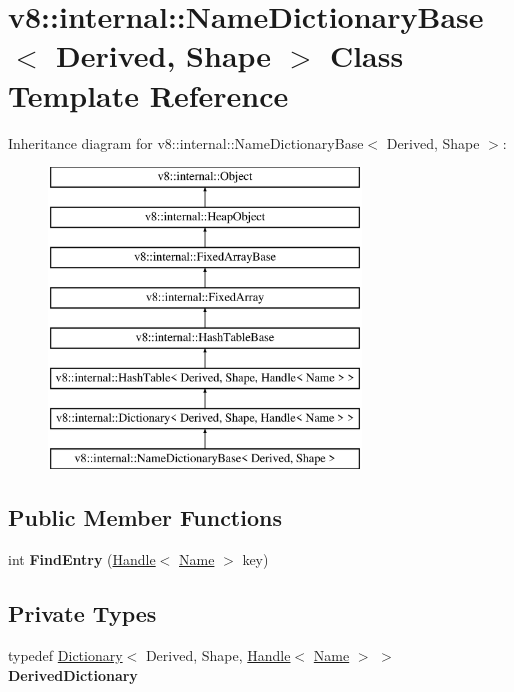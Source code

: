 \hypertarget{classv8_1_1internal_1_1_name_dictionary_base}{}\section{v8\+:\+:internal\+:\+:Name\+Dictionary\+Base$<$ Derived, Shape $>$ Class Template Reference}
\label{classv8_1_1internal_1_1_name_dictionary_base}
Inheritance diagram for v8\+:\+:internal\+:\+:Name\+Dictionary\+Base$<$ Derived, Shape $>$\+:\begin{figure}[H]
\begin{center}
\leavevmode
\includegraphics[height=8.000000cm]{classv8_1_1internal_1_1_name_dictionary_base}
\end{center}
\end{figure}
\subsection*{Public Member Functions}
\begin{DoxyCompactItemize}
\item 
int {\bfseries Find\+Entry} (\hyperlink{classv8_1_1internal_1_1_handle}{Handle}$<$ \hyperlink{classv8_1_1internal_1_1_name}{Name} $>$ key)\hypertarget{classv8_1_1internal_1_1_name_dictionary_base_af39c49fc98a5f796ad6f3aa4c05ce779}{}\label{classv8_1_1internal_1_1_name_dictionary_base_af39c49fc98a5f796ad6f3aa4c05ce779}

\end{DoxyCompactItemize}
\subsection*{Private Types}
\begin{DoxyCompactItemize}
\item 
typedef \hyperlink{classv8_1_1internal_1_1_dictionary}{Dictionary}$<$ Derived, Shape, \hyperlink{classv8_1_1internal_1_1_handle}{Handle}$<$ \hyperlink{classv8_1_1internal_1_1_name}{Name} $>$ $>$ {\bfseries Derived\+Dictionary}\hypertarget{classv8_1_1internal_1_1_name_dictionary_base_a1f3c4bbe2062a64531e419baaaec8291}{}\label{classv8_1_1internal_1_1_name_dictionary_base_a1f3c4bbe2062a64531e419baaaec8291}

\end{DoxyCompactItemize}
